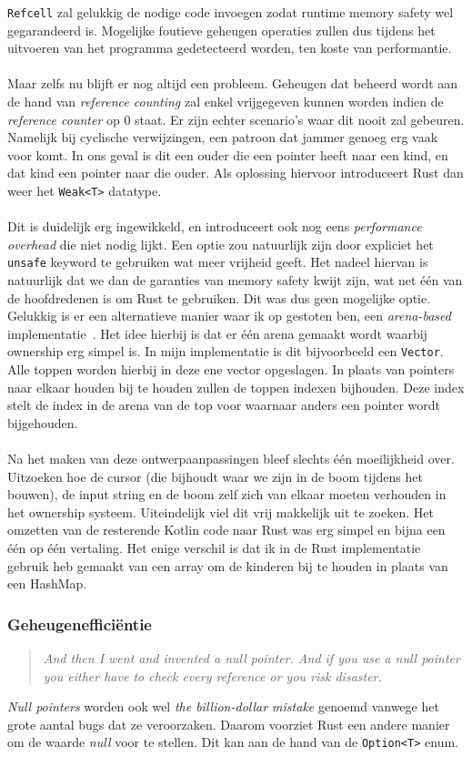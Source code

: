 \texttt{Refcell} zal gelukkig de nodige code invoegen zodat runtime memory safety wel gegarandeerd is.
Mogelijke foutieve geheugen operaties zullen dus tijdens het uitvoeren van het programma gedetecteerd worden, ten koste van performantie.
\\ \\
Maar zelfs nu blijft er nog altijd een probleem.
Geheugen dat beheerd wordt aan de hand van \textit{reference counting} zal enkel vrijgegeven kunnen worden indien de \textit{reference counter} op 0 staat.
Er zijn echter scenario's waar dit nooit zal gebeuren.
Namelijk bij cyclische verwijzingen, een patroon dat jammer genoeg erg vaak voor komt.
In ons geval is dit een ouder die een pointer heeft naar een kind, en dat kind een pointer naar die ouder.
Als oplossing hiervoor introduceert Rust dan weer het \texttt{Weak<T>} datatype.
\\ \\
Dit is duidelijk erg ingewikkeld, en introduceert ook nog eens \textit{performance overhead} die niet nodig lijkt.
Een optie zou natuurlijk zijn door expliciet het \texttt{unsafe} keyword te gebruiken wat meer vrijheid geeft.
Het nadeel hiervan is natuurlijk dat we dan de garanties van memory safety kwijt zijn, wat net één van de hoofdredenen is om Rust te gebruiken.
Dit was dus geen mogelijke optie.
Gelukkig is er een alternatieve manier waar ik op gestoten ben, een \textit{arena-based} implementatie~\cite{rust_arena_trees}.
Het idee hierbij is dat er één arena gemaakt wordt waarbij ownership erg simpel is.
In mijn implementatie is dit bijvoorbeeld een \texttt{Vector}.
Alle toppen worden hierbij in deze ene vector opgeslagen.
In plaats van pointers naar elkaar houden bij te houden zullen de toppen indexen bijhouden.
Deze index stelt de index in de arena van de top voor waarnaar anders een pointer wordt bijgehouden.
\\ \\
Na het maken van deze ontwerpaanpassingen bleef slechts één moeilijkheid over.
Uitzoeken hoe de cursor (die bijhoudt waar we zijn in de boom tijdens het bouwen), de input string en de boom zelf zich van elkaar moeten verhouden in het ownership systeem.
Uiteindelijk viel dit vrij makkelijk uit te zoeken.
Het omzetten van de resterende Kotlin code naar Rust was erg simpel en bijna een één op één vertaling.
Het enige verschil is dat ik in de Rust implementatie gebruik heb gemaakt van een array om de kinderen bij te houden in plaats van een HashMap.

\subsubsection{Geheugenefficiëntie}
\begin{quote}
    \textit{And then I went and invented a null pointer.
    And if you use a null pointer you either have to check every reference or you risk disaster. \cite{null_mistake}}
\end{quote}
\textit{Null pointers} worden ook wel \textit{the billion-dollar mistake} genoemd vanwege het grote aantal bugs dat ze veroorzaken.
Daarom voorziet Rust een andere manier om de waarde \textit{null} voor te stellen.
Dit kan aan de hand van de \texttt{Option<T>} enum.

